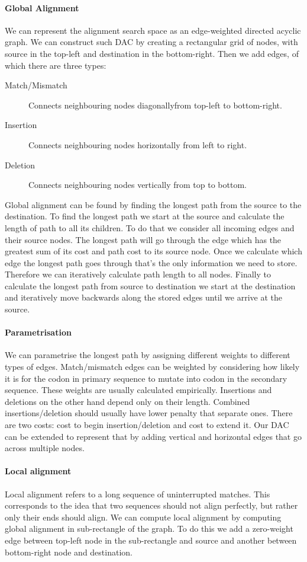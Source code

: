 \documentclass[a5paper]{report}
\begin{document}
\paragraph{Global Alignment}
We can represent the alignment search space as an edge-weighted directed acyclic graph.
We can construct such DAC by creating a rectangular grid of nodes, with source in the top-left and destination in the bottom-right.
Then we add edges, of which there are three types:
\begin{description}
\item[Match/Mismatch] Connects neighbouring nodes diagonally\break from top-left to bottom-right.
\item[Insertion] Connects neighbouring nodes horizontally from left to right.
\item[Deletion] Connects neighbouring nodes vertically from top to bottom.
\end{description}
Global alignment can be found by finding the longest path from the source to the destination.
To find the longest path we start at the source and calculate the length of path to all its children.
To do that we consider all incoming edges and their source nodes.
The longest path will go through the edge which has the greatest sum of its cost and path cost to its source node.
Once we calculate which edge the longest path goes through that's the only information we need to store.
Therefore we can iteratively calculate path length to all nodes.
Finally to calculate the longest path from source to destination we start at the destination and iteratively move backwards along the stored edges until we arrive at the source.
\paragraph{Parametrisation}
We can parametrise the longest path by assigning different weights to different types of edges.
Match/mismatch edges can be weighted by considering how likely it is for the codon in primary sequence to mutate into codon in the secondary sequence.
These weights are usually calculated empirically.
Insertions and deletions on the other hand depend only on their length.
Combined insertions/deletion should usually have lower penalty that separate ones.
There are two costs: cost to begin insertion/deletion and cost to extend it.
Our DAC can be extended to represent that by adding vertical and horizontal edges that go across multiple nodes.
\paragraph{Local alignment}
Local alignment refers to a long sequence of uninterrupted matches.
This corresponds to the idea that two sequences should not align perfectly, but rather only their ends should align.
We can compute local alignment by computing global alignment in sub-rectangle of the graph.
To do this we add a zero-weight edge between top-left node in the sub-rectangle and source and another between bottom-right node and destination.
\end{document}
